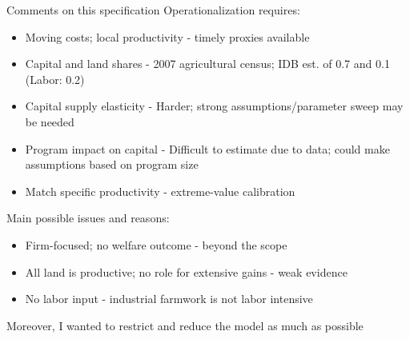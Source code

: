 \documentclass[aspectratio=169]{beamer}
\begin{document}
\begin{frame}{Comments on this specification}
Operationalization requires:
\begin{itemize}
  \item Moving costs; local productivity - timely proxies available
  \item Capital and land shares - 2007 agricultural census; IDB est. of 0.7 and 0.1 (Labor: 0.2)
  \item Capital supply elasticity - Harder; strong assumptions/parameter sweep may be needed
  \item Program impact on capital - Difficult to estimate due to data; could make assumptions based on program size
  \item Match specific productivity - extreme-value calibration
\end{itemize}
\vspace{1em}

Main possible issues and reasons:
\begin{itemize}
  \item Firm-focused; no welfare outcome - beyond the scope
  \item All land is productive; no role for extensive gains - weak evidence
  \item No labor input - industrial farmwork is not labor intensive
\end{itemize}
Moreover, I wanted to restrict and reduce the model as much as possible 
\end{frame}
\end{document}
